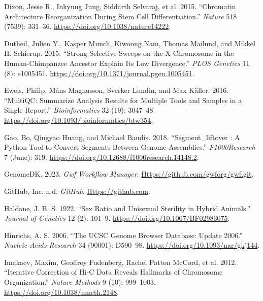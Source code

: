 \documentclass[
  11pt,
  a4paper,
]{scrbook}
\newlength{\cslhangindent}
\newenvironment{CSLReferences}[2] %
 {\begin{list}{}{%
  \setlength{\itemindent}{0pt}
  \setlength{\leftmargin}{0pt}
  \setlength{\parsep}{0pt}
  \ifodd #1
   \setlength{\leftmargin}{\cslhangindent}
   \setlength{\itemindent}{-1\cslhangindent}
  \fi
  \setlength{\itemsep}{#2\baselineskip}}}
 {\end{list}}
\begin{document}
\begin{CSLReferences}{1}{1}
Dixon, Jesse R., Inkyung Jung, Siddarth Selvaraj, et al. 2015.
{``Chromatin Architecture Reorganization During Stem Cell
Differentiation.''} \emph{Nature} 518 (7539): 331--36.
\url{https://doi.org/10.1038/nature14222}.

Dutheil, Julien Y., Kasper Munch, Kiwoong Nam, Thomas Mailund, and
Mikkel H. Schierup. 2015. {``Strong {Selective Sweeps} on the {X
Chromosome} in the {Human-Chimpanzee Ancestor Explain Its Low
Divergence}.''} \emph{PLOS Genetics} 11 (8): e1005451.
\url{https://doi.org/10.1371/journal.pgen.1005451}.

Ewels, Philip, Måns Magnusson, Sverker Lundin, and Max Käller. 2016.
{``{MultiQC}: Summarize Analysis Results for Multiple Tools and Samples
in a Single Report.''} \emph{Bioinformatics} 32 (19): 3047--48.
\url{https://doi.org/10.1093/bioinformatics/btw354}.

Gao, Bo, Qingyao Huang, and Michael Baudis. 2018. {``Segment\_liftover :
A {Python} Tool to Convert Segments Between Genome Assemblies.''}
\emph{F1000Research} 7 (June): 319.
\url{https://doi.org/10.12688/f1000research.14148.2}.

GenomeDK. 2023. \emph{Gwf Workflow Manager}.
\href{https://github.com/gwforg/gwf.git}{Https://github.com/gwforg/gwf.git}.

GitHub, Inc. n.d. \emph{GitHub}.
\href{https://github.com}{Https://github.com}.

Haldane, J. B. S. 1922. {``Sex Ratio and Unisexual Sterility in Hybrid
Animals.''} \emph{Journal of Genetics} 12 (2): 101--9.
\url{https://doi.org/10.1007/BF02983075}.

Hinrichs, A. S. 2006. {``The {UCSC Genome Browser Database}: Update
2006.''} \emph{Nucleic Acids Research} 34 (90001): D590--98.
\url{https://doi.org/10.1093/nar/gkj144}.

Imakaev, Maxim, Geoffrey Fudenberg, Rachel Patton McCord, et al. 2012.
{``Iterative Correction of {Hi-C} Data Reveals Hallmarks of Chromosome
Organization.''} \emph{Nature Methods} 9 (10): 999--1003.
\url{https://doi.org/10.1038/nmeth.2148}.


\end{CSLReferences}
\end{document}
